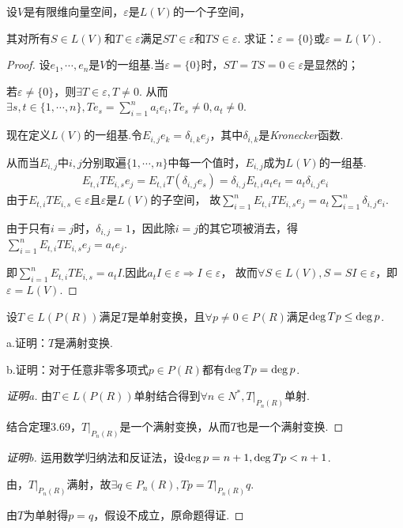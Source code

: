 \newpage

\begin{problem}[17]\label{3.D.17}
    设\(V\)是有限维向量空间，\(\varepsilon\)是\(L(V)\)的一个子空间，

    其对所有\(S \in L(V)\)和\(T \in \varepsilon\)满足\(ST \in \varepsilon\)和\(TS \in \varepsilon\).
    求证：\(\varepsilon=\{0\}\)或\(\varepsilon=L(V)\).    
\end{problem}

\begin{proof}
    设\(e_1,\cdots,e_n\)是\(V\)的一组基.当\(\varepsilon =\{0\}\)时，\(ST=TS=0 \in \varepsilon\)是显然的；

    若\(\varepsilon \ne \{0\}\)，则\(\exists T \in \varepsilon, T \ne 0\).
    从而\(\exists s,t \in \{1,\cdots,n\},Te_s=\sum_{i=1}^n a_ie_i ,Te_s \ne 0, a_t \ne 0\).
    
    现在定义\(L(V)\)的一组基.令\(E_{i,j}e_k=\delta_{i,k}e_j\)，其中\(\delta_{i,k}\)是\textit{Kronecker}函数.
    
    从而当\(E_{i,j}\)中\(i,j\)分别取遍\(\{1,\cdots,n\}\)中每一个值时，\(E_{i,j}\)成为\(L(V)\)的一组基.
    \begin{align*}
        E_{t,i}TE_{i,s}e_j=E_{t,i}T(\delta_{i,j} e_s)=\delta_{i,j}E_{t,i}a_te_t=a_t\delta_{i,j}e_i
    \end{align*}
    由于\(E_{t,i}TE_{i,s} \in \varepsilon\)且\(\varepsilon\)是\(L(V)\)的子空间，
    故\(\sum_{i=1}^n E_{t,i}TE_{i,s}e_j=a_t \sum_{i=1}^n \delta_{i,j}e_i\).
    
    由于只有\(i=j\)时，\(\delta_{i,j}=1\)，因此除\(i=j\)的其它项被消去，得\(\sum_{i=1}^n E_{t,i}TE_{i,s} e_j=a_te_j\).
    
    即\(\sum_{i=1}^n E_{t,i} T E_{i,s} =a_t I\).因此\(a_t I \in \varepsilon \Rightarrow I \in \varepsilon\)，
    故而\(\forall S \in L(V),S=SI \in \varepsilon\)，即\(\varepsilon=L(V)\).
\end{proof}

\begin{problem}[19]\label{3.D.19}
    设\(T \in L(P(R))\)满足\(T\)是单射变换，且\(\forall p \ne 0 \in P(R)\)满足\(\operatorname{deg} Tp \leq \operatorname{deg} p\).

    a.证明：\(T\)是满射变换.

    b.证明：对于任意非零多项式\(p \in P(R)\)都有\(\operatorname{deg} Tp=\operatorname{deg} p\).
\end{problem}

\begin{proof}[证明a]
    由\(T \in L(P(R))\)单射结合得到\(\forall n \in N^*,T|_{P_n(R)}\)单射.

    结合定理3.69，\(T|_{P_n(R)}\)是一个满射变换，从而\(T\)也是一个满射变换.    
\end{proof}

\begin{proof}[证明b]
    运用数学归纳法和反证法，设\(\operatorname{deg} p=n+1,\operatorname{deg} Tp<n+1\).

    由，\(T|_{P_n(R)}\)满射，故\(\exists q \in P_n(R),Tp=T|_{P_n(R)}q\).
    
    由\(T\)为单射得\(p=q\)，假设不成立，原命题得证.    
\end{proof}

